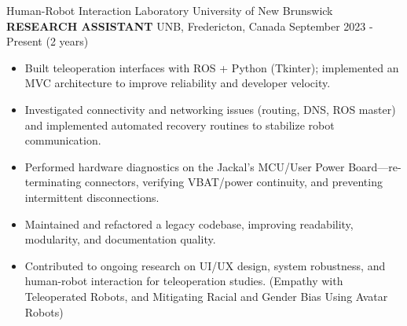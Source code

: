 
\begin{cventries}
    \cventry
    {Human-Robot Interaction Laboratory \textemdash University of New Brunswick}
    {\textbf{RESEARCH ASSISTANT}}
    {UNB, Fredericton, Canada}
    {September 2023 - Present (2 years)}
    {
        \begin{itemize}
            \item Built teleoperation interfaces with ROS + Python (Tkinter); implemented an MVC architecture to improve reliability and developer velocity.
            \item Investigated connectivity and networking issues (routing, DNS, ROS master) and implemented automated recovery routines to stabilize robot communication.
            \item Performed hardware diagnostics on the Jackal’s MCU/User Power Board—re-terminating connectors, verifying VBAT/power continuity, and preventing intermittent disconnections.
            \item Maintained and refactored a legacy codebase, improving readability, modularity, and documentation quality.
            \item Contributed to ongoing research on UI/UX design, system robustness, and human-robot interaction for teleoperation studies. (Empathy with Teleoperated Robots, and Mitigating Racial and Gender Bias Using Avatar Robots)
        \end{itemize}}
    \vspace{0.4 cm}
\end{cventries}



